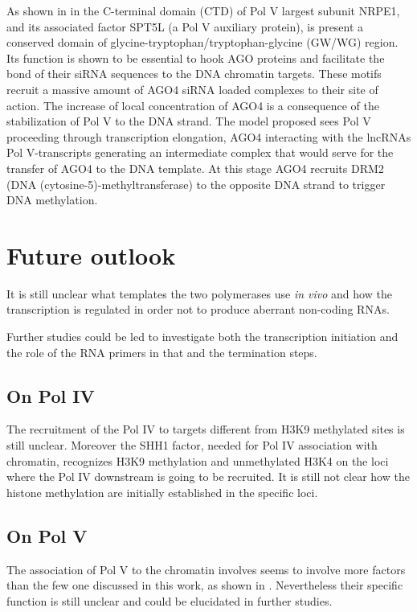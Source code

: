 \documentclass[a4paper, twocolumn]{article}
\begin{document}
As shown in \cite{LAHMY2016} in the C-terminal domain (CTD) of Pol V largest subunit NRPE1, and its associated factor SPT5L (a Pol V auxiliary protein), is present a conserved domain of glycine-tryptophan/tryptophan-glycine (GW/WG) region. Its function is shown to be essential to hook AGO proteins and facilitate the bond of their siRNA sequences to the DNA chromatin targets. These motifs recruit a massive amount of AGO4 siRNA loaded complexes to their site of action. The increase of local concentration of AGO4 is a consequence of the stabilization of Pol V to the DNA strand. The model proposed sees Pol V proceeding through transcription elongation, AGO4 interacting with the lncRNAs Pol V-transcripts generating an intermediate complex that would serve for the transfer of AGO4 to the DNA template. At this stage AGO4 recruits DRM2 (DNA (cytosine-5)-methyltransferase) to the opposite DNA strand to trigger DNA methylation.



\section{Future outlook}

It is still unclear what templates the two polymerases use \textit{in vivo} and how the transcription is regulated in order not to produce aberrant non-coding RNAs. 

Further studies could be led to investigate both the transcription initiation and the role of the RNA primers in that and the termination steps. 


\subsection{On Pol IV}

The recruitment of the Pol IV to targets different from H3K9 methylated sites is still unclear. Moreover the SHH1 factor, needed for Pol IV association with chromatin, recognizes H3K9 methylation and unmethylated H3K4 on the loci where the Pol IV downstream is going to be recruited. \cite{LAW2013} It is still not clear how the histone methylation are initially established in the specific loci.


\subsection{On Pol V}

The association of Pol V to the chromatin involves seems to involve more factors than the few one discussed in this work, as shown in \cite{STROUD2012}. Nevertheless  their specific function is still unclear and could be elucidated in further studies. 




\end{document}
